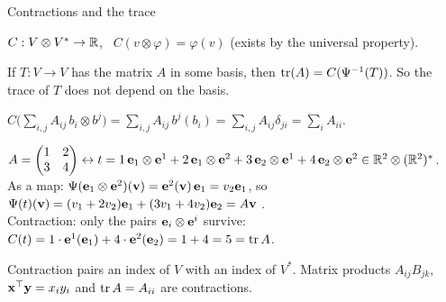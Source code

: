 \documentclass[aspectratio=1610,11pt]{beamer}
\begin{document}
\begin{frame}{Contractions and the trace}
    \begin{definition}
        \small $C: V \otimes V^* \to \mathbb{R}$, \ $C(v \otimes \varphi) = \varphi(v)$ (exists by the universal property).
    \end{definition}
    \begin{proposition}
        \small If $T: V \to V$ has the matrix $A$ in some basis, then $\operatorname{tr}(A) = C(\Psi^{-1}(T))$. So the trace of $T$ does not depend on the basis.
    \end{proposition}
    \small
    $C\big(\sum_{i,j}A_{ij}\,b_i \otimes b^j\big) = \sum_{i,j}A_{ij}\,b^j(b_i) = \sum_{i,j}A_{ij}\delta_{ji} = \sum_iA_{ii}$.
    \begin{example}
        \small $A = \begin{pmatrix} 1 & 2 \\ 3 & 4 \end{pmatrix} \leftrightarrow t = 1\,\mathbf{e}_1 \otimes \mathbf{e}^1 + 2\,\mathbf{e}_1 \otimes \mathbf{e}^2 + 3\,\mathbf{e}_2 \otimes \mathbf{e}^1 + 4\,\mathbf{e}_2 \otimes \mathbf{e}^2 \in \mathbb{R}^2 \otimes (\mathbb{R}^2)^*$.
        \\[0.2em]
        As a map: $\Psi(\mathbf{e}_1 \otimes \mathbf{e}^2)(\mathbf{v}) = \mathbf{e}^2(\mathbf{v})\,\mathbf{e}_1 = v_2\mathbf{e}_1$, so $\Psi(t)(\mathbf{v}) = (v_1 + 2v_2)\mathbf{e}_1 + (3v_1 + 4v_2)\mathbf{e}_2 = A\mathbf{v}$ \checkmark.
        \\[0.2em]
        Contraction: only the pairs $\mathbf{e}_i \otimes \mathbf{e}^i$ survive: $C(t) = 1 \cdot \mathbf{e}^1(\mathbf{e}_1) + 4 \cdot \mathbf{e}^2(\mathbf{e}_2) = 1 + 4 = 5 = \operatorname{tr} A$.
    \end{example}
    Contraction pairs an index of $V$ with an index of $V^*$. Matrix products $A_{ij}B_{jk}$, $\mathbf{x}^\top\mathbf{y} = x_iy_i$ and $\operatorname{tr} A = A_{ii}$ are contractions.
\end{frame}

\end{document}
